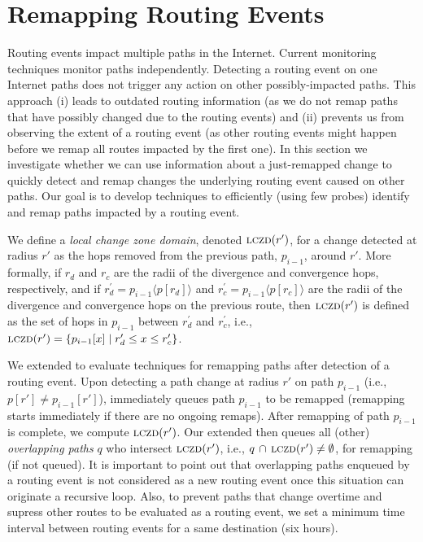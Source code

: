 \section{Remapping Routing Events}
\label{sec:patching}

Routing events impact multiple paths in the Internet. Current
monitoring techniques monitor paths independently. Detecting
a routing event on one Internet paths does not trigger any action on
other possibly-impacted paths.  This approach (i) leads to outdated
routing information (as we do not remap paths that have possibly
changed due to the routing events) and (ii) prevents us from
observing the extent of a routing event (as other routing events
might happen before we remap all routes impacted by the first one).
In this section we investigate whether we can use information about
a just-remapped change to quickly detect and remap changes the
underlying routing event caused on other paths.  Our goal is to
develop techniques to efficiently (using few probes) identify and
remap paths impacted by a routing event.

\newcommand{\lczd}{\ensuremath\mathrm{\textsc{lczd}}}

We define a \emph{local change zone domain}, denoted $\lczd(r')$,
for a change detected at radius $r'$ as the hops removed from the
previous path, $p_{i-1}$, around $r'$. More formally, if $r_d$ and
$r_c$ are the radii of the divergence and convergence hops,
respectively, and if $r^\prime_d = p_{i-1}\langle p[r_d]\rangle$ and
$r^\prime_c = p_{i-1}\langle p[r_c]\rangle$ are the radii of the
divergence and convergence hops on the previous route, then
$\lczd(r')$ is defined as the set of hops in $p_{i-1}$ between
$r^\prime_d$ and $r^\prime_c$, i.e., $\lczd(r') = \{p_{i-1}[x]
\mid{} r^\prime_d \le x \le r^\prime_c\}$.

We extended \dtrack{} to evaluate techniques for remapping paths
after detection of a routing event.  Upon detecting a path change at
radius $r'$ on path $p_{i-1}$ (i.e., $p[r'] \ne p_{i-1}[r']$),
\dtrack{} immediately queues path $p_{i-1}$ to be remapped
(remapping starts immediately if there are no ongoing remaps).
After remapping of path $p_{i-1}$ is complete, we compute
$\lczd(r')$. Our extended \dtrack{} then queues all (other)
\emph{overlapping paths} $q$ who intersect $\lczd(r')$, i.e., $q\,
\cap\,\lczd(r') \ne \emptyset$, for remapping (if not queued). It is important
to point out that overlapping paths enqueued by a routing event is
not considered as a new routing event once this situation can
originate a recursive loop. Also, to prevent paths that change
overtime and supress other routes to be evaluated as a routing event,
we set a minimum time interval between routing events for a same destination
(six hours). 

